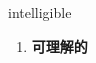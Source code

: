 
\begin{frame}
{\huge intelligible}
\begin{center}
\begin{enumerate}\Large
  \item \textbf{可理解的}
\end{enumerate}
\end{center}
\end{frame}
